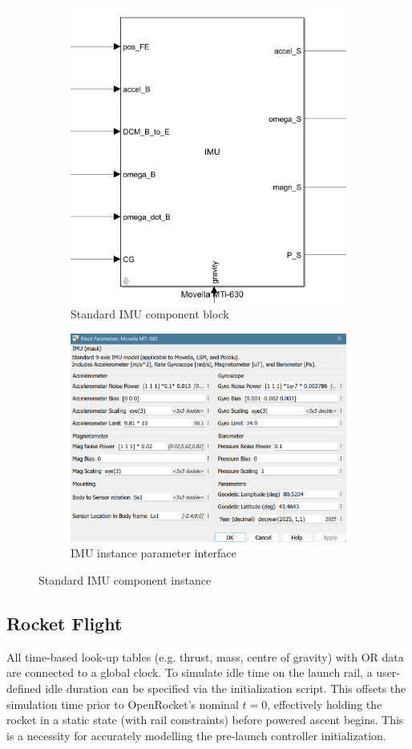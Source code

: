 \begin{figure}[ht]
    \centering
    \begin{subfigure}{0.45\textwidth}
        \centering
        \includegraphics[width=0.5\linewidth]{images-plant/sim_imu_instance.png}
        \caption{Standard IMU component block}
        \label{fig:imu-component_inst}
    \end{subfigure}
    \begin{subfigure}{0.45\textwidth}
        \centering
        \includegraphics[width=0.8\linewidth]{images-plant/sim_imu_mask.png}
        \caption{IMU instance parameter interface}
        \label{fig:imu-component_mask}
    \end{subfigure}
    \caption{Standard IMU component instance}
    \label{fig:imu-component}
\end{figure}

\subsection{Rocket Flight}
All time-based look-up tables (e.g. thrust, mass, centre of gravity) with OR data are connected to a global clock.
To simulate idle time on the launch rail, a user-defined idle duration can be specified via the initialization script. This  offsets the simulation time prior to OpenRocket’s nominal $t=0$, effectively holding the rocket in a static state (with rail constraints) before powered ascent begins. 
This is a necessity for accurately modelling the pre-launch controller initialization.

